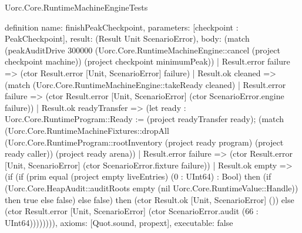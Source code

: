 \begin{lexlean}{Uorc.Core.RuntimeMachineEngineTests}
\begin{semanticmodule}
definition{
  name: finishPeakCheckpoint,
  parameters: [checkpoint : PeakCheckpoint],
  result: (Result Unit ScenarioError),
  body: (match (peakAuditDrive 300000 (Uorc.Core.RuntimeMachineEngine::cancel (project checkpoint machine)) (project checkpoint minimumPeak))
    | Result.error failure => (ctor Result.error [Unit, ScenarioError] failure)
    | Result.ok cleaned => (match (Uorc.Core.RuntimeMachineEngine::takeReady cleaned)
      | Result.error failure => (ctor Result.error [Unit, ScenarioError] (ctor ScenarioError.engine failure))
      | Result.ok readyTransfer => (let ready : Uorc.Core.RuntimeProgram::Ready := (project readyTransfer ready); (match (Uorc.Core.RuntimeMachineFixtures::dropAll (Uorc.Core.RuntimeProgram::rootInventory (project ready program) (project ready caller)) (project ready arena))
        | Result.error failure => (ctor Result.error [Unit, ScenarioError] (ctor ScenarioError.fixture failure))
        | Result.ok empty => (if (if (prim equal (project empty liveEntries) (0 : UInt64) : Bool) then (if (Uorc.Core.HeapAudit::auditRoots empty (nil Uorc.Core.RuntimeValue::Handle)) then true else false) else false) then (ctor Result.ok [Unit, ScenarioError] ()) else (ctor Result.error [Unit, ScenarioError] (ctor ScenarioError.audit (66 : UInt64)))))))),
  axioms: [Quot.sound, propext],
  executable: false
}


\end{semanticmodule}
\end{lexlean}
